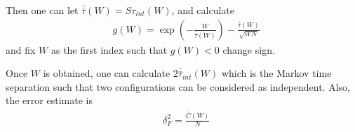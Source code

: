 Then one can let $\bar{\bar{\tau}} (W)= S\tau _{int}(W)$, and calculate
\begin{equation}
\begin{split}
&g(W)=\exp \left(-\frac{W}{\bar{\bar{\tau}} (W)}\right)-\frac{\bar{\bar{\tau}} (W)}{\sqrt{WN}}
\end{split}
\end{equation}
and fix $W$ as the first index such that $g(W)<0$ change sign.

Once $W$ is obtained, one can calculate $2\bar{\bar{\tau}}_{int}(W)$ which is the Markov time separation such that two configurations can be considered as independent. Also, the error estimate is
\begin{equation}
\begin{split}
&\delta _F^2 = \frac{\bar{\bar{C}}(W)}{N}
\end{split}
\end{equation}


